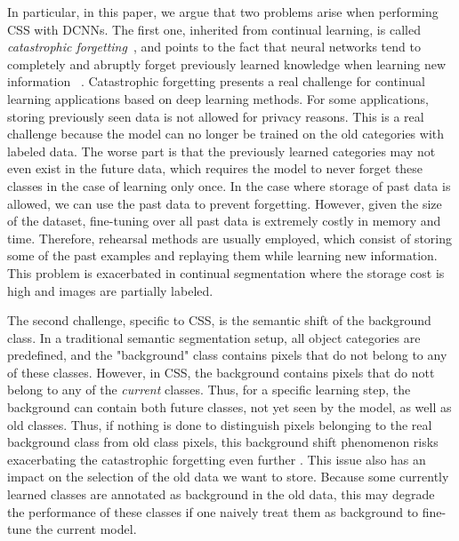In particular, in this paper, we argue that two problems arise when performing CSS with DCNNs. The
first one, inherited from continual learning, is called \textit{catastrophic
    forgetting}~\citep{robins1995catastrophicforgetting,french1999catastrophicforgetting,thrun1998lifelonglearning},
and points to the fact that neural networks tend to completely and abruptly forget previously
learned knowledge when learning new information ~\citep{kemker2018measuringforgetting}. Catastrophic
forgetting presents a real challenge for continual learning applications based on deep learning
methods. For some applications, storing previously seen data is not allowed for privacy reasons.
This is a real challenge because the model can no longer be trained on the old categories with
labeled data. The worse part is that the previously learned categories may not even exist in the
future data, which requires the model to never forget these classes in the case of learning only
once. In the case where storage of past data is allowed, we can use the past data to prevent
forgetting. However, given the size of the dataset, fine-tuning over all past data is extremely
costly in memory and time. Therefore, rehearsal methods are usually employed, which consist of
storing some of the past examples and replaying them while learning new information. This problem is
exacerbated in continual segmentation where the storage cost is high and images are partially
labeled.

The second challenge, specific to CSS, is the semantic shift of the background class. In a
traditional semantic segmentation setup, all object categories are predefined, and the "background"
class contains pixels that do not belong to any of these classes. However, in CSS, the background
contains pixels that do nott belong to any of the \textit{current} classes. Thus, for a specific
learning step, the background can contain both future classes, not yet seen by the model, as well as
old classes. Thus, if nothing is done to distinguish pixels belonging to the real background class
from old class pixels, this background shift phenomenon risks exacerbating the catastrophic
forgetting even further \citep{cermelli2020modelingthebackground}. This issue also has an impact on
the selection of the old data we want to store. Because some currently learned classes are annotated
as background in the old data, this may degrade the performance of these classes if one naively
treat them as background to fine-tune the current model.

